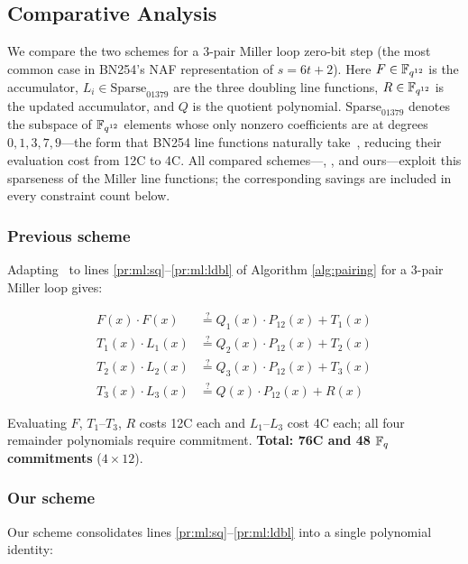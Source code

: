 \subsection{Comparative Analysis~\label{sec:ops:comp-analysis}}

We compare the two schemes for a 3-pair Miller loop zero-bit step (the most common case in BN254's NAF\cite{naf} representation of $s = 6t+2$). Here $F \in \mathbb{F}_{q^{12}}$ is the accumulator, $L_i \in \text{Sparse}_{01379}$ are the three doubling line functions, $R \in \mathbb{F}_{q^{12}}$ is the updated accumulator, and $Q$ is the quotient polynomial. $\text{Sparse}_{01379}$ denotes the subspace of $\mathbb{F}_{q^{12}}$ elements whose only nonzero coefficients are at degrees $0,1,3,7,9$---the form that BN254 line functions naturally take~\cite{ACNS:ElHousni23}, reducing their evaluation cost from 12C to 4C. All compared schemes---\cite{ACNS:ElHousni23}, \cite{FXFM23}, and ours---exploit this sparseness of the Miller line functions; the corresponding savings are included in every constraint count below.

\subsubsection{Previous scheme}

Adapting~\cite{FXFM23} to lines \ref{pr:ml:sq}--\ref{pr:ml:ldbl} of Algorithm \ref{alg:pairing} for a 3-pair Miller loop gives:

\begin{align*}
    F(x) \cdot F(x) &\stackrel{?}{=} Q_1(x) \cdot P_{12}(x) + T_1(x) \\
    T_1(x) \cdot L_1(x) &\stackrel{?}{=} Q_2(x) \cdot P_{12}(x) + T_2(x) \\
    T_2(x) \cdot L_2(x) &\stackrel{?}{=} Q_3(x) \cdot P_{12}(x) + T_3(x) \\
    T_3(x) \cdot L_3(x) &\stackrel{?}{=} Q(x) \cdot P_{12}(x) + R(x)
\end{align*}

Evaluating $F$, $T_1$–$T_3$, $R$ costs 12C each and $L_1$–$L_3$ cost 4C each; all four remainder polynomials require commitment. \textbf{Total: 76C and 48 $\mathbb{F}_q$ commitments} ($4 \times 12$).

\subsubsection{Our scheme}\label{sec:op:comp:our}

Our scheme consolidates lines \ref{pr:ml:sq}--\ref{pr:ml:ldbl} into a single polynomial identity:


